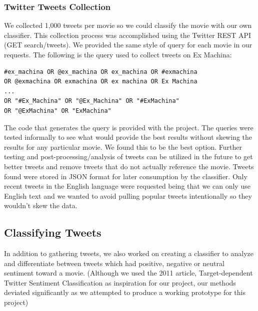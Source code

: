 \documentclass[12pt]{article}
\begin{document}
\subsubsection{Twitter Tweets Collection}
We collected 1,000 tweets per movie so we could classify the movie with our own classifier. This collection process was accomplished using the Twitter REST API (GET search/tweets). We provided the same style of query for each movie in our requests. The following is the query used to collect tweets on Ex Machina:
\begin{verbatim}
#ex_machina OR @ex_machina OR ex_machina OR #exmachina 
OR @exmachina OR exmachina OR ex machina OR Ex Machina 
...
OR "#Ex_Machina" OR "@Ex_Machina" OR "#ExMachina" 
OR "@ExMachina" OR "ExMachina"
\end{verbatim}
The code that generates the query is provided with the project. The queries were tested informally to see what would provide the best results without skewing the results for any particular movie. We found this to be the best option. Further testing and post-processing/analysis of tweets can be utilized in the future to get better tweets and remove tweets that do not actually reference the movie.
Tweets found were stored in JSON format for later consumption by the classifier.
Only recent tweets in the English language were requested being that we can only use English text and we wanted to avoid pulling popular tweets intentionally so they wouldn't skew the data.
\subsection{Classifying Tweets}\label{S:3}
In addition to gathering tweets, we also worked on creating a classifier to analyze and differentiate between tweets which had positive, negative or neutral sentiment toward a movie. (Although we used the 2011 article, Target-dependent Twitter Sentiment Classification \cite{TwitterSentiment:2011} as inspiration for our project, our methods deviated significantly as we attempted to produce a working prototype for this project)
\end{document}
